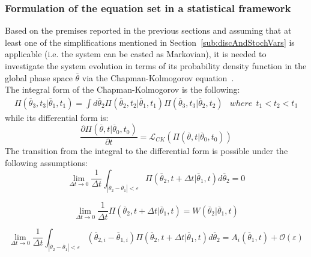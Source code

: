 \subsubsection{Formulation of the equation set in a statistical framework}
Based on the premises reported in the previous sections and assuming 
that at least one of the simplifications mentioned in 
Section~\ref{sub:discAndStochVars} is applicable (i.e. the system can be
casted as Markovian), it is needed to investigate the system evolution 
in terms of its probability density function in the global phase space 
$\overline{\theta}$ via the Chapman-Kolmogorov 
equation~\cite{ProbReactoDynamicsDevooght}.
\\The integral form of the Chapman-Kolmogorov is the following: 
\begin{equation}
\label{eq:chapKolmogIntegralForm}
\begin{matrix}
\Pi \left (\overline{\theta}_{3},t_{3}|\overline{\theta}_{1},t_{1}  \right ) = \int 
d\overline{\theta}_{2} \Pi\left (\overline{\theta}_{2},t_{2}|
\overline{\theta}_{1},t_{1}  \right )   \Pi\left (\overline{\theta}_{3},t_{3}|
\overline{\theta}_{2},t_{2}  \right )   & 
where \: \:   t_{1} < t_{2} < t_{3}
\end{matrix}
\end{equation}
while its differential form is:
\begin{equation}
\label{eq:chapKolmogDiffForm}
\frac{\partial \Pi \left (\overline{\theta},t|\overline{\theta}_{0},t_{0}  \right )  }{\partial t} =
\mathcal{L}_{CK}\left (   \Pi \left (\overline{\theta},t|\overline{\theta}_{0},t_{0}  \right ) \right )
\end{equation}
The transition from the integral to the differential form is possible under the following assumptions: 
\begin{equation}
\label{eq:chapKolmogAssump1}
\lim_{\Delta t \to 0} \frac{1}{\Delta t}  \int_{|
\overline{\theta}_{2}-\overline{\theta}_{1}|<\varepsilon }   \Pi \left 
(\overline{\theta}_{2},t+\Delta t|\overline{\theta}_{1},t  \right ) 
d\overline{\theta}_{2} = 0
\end{equation}

\begin{equation}
\label{eq:chapKolmogAssump2}
\lim_{\Delta t \to 0} \frac{1}{\Delta t} \Pi \left (\overline{\theta}_{2},t+\Delta t|
\overline{\theta}_{1},t  \right ) = W\left ( \overline{\theta}_{2}|
\overline{\theta}_{1},t \right )
\end{equation}

\begin{equation}
\label{eq:chapKolmogAssump3}
\lim_{\Delta t \to 0} \frac{1}{\Delta t}  \int_{|
\overline{\theta}_{2}-\overline{\theta}_{1}|<\varepsilon }   
\left ( \overline{\theta}_{2,i} - \overline{\theta}_{1,i} \right )
\Pi \left (\overline{\theta}_{2},t+\Delta t|\overline{\theta}_{1},t  \right ) 
d\overline{\theta}_{2} = A_{i}\left ( \overline{\theta}_{1},t \right ) + 
\mathcal{O}\left ( \varepsilon \right )
\end{equation}

